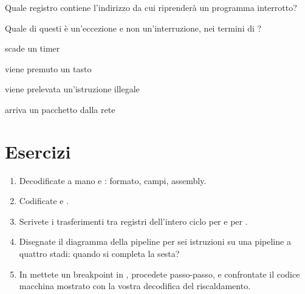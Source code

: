 \begin{quiz}{Quale registro contiene l'indirizzo da cui riprenderà un programma \riscv interrotto?}
\item {}
\item {}
\item {}
\item {}
\end{quiz}

\begin{quiz}{Quale di questi è un'eccezione e non un'interruzione, nei termini di \riscv?}
\item scade un timer
\item viene premuto un tasto
\item viene prelevata un'istruzione illegale
\item arriva un pacchetto dalla rete
\end{quiz}

\section{Esercizi}

\begin{exercise}
\begin{enumerate}[nosep]
\item Decodificate a mano  e : formato, campi,
  assembly.
\item Codificate  e .
\item Scrivete i trasferimenti tra registri dell'intero ciclo per
   e per .
\item Disegnate il diagramma della pipeline per sei istruzioni su una pipeline
  a quattro stadi: quando si completa la sesta?
\item In \prgqt mettete un breakpoint in , procedete
  passo-passo, e confrontate il codice macchina mostrato con la vostra
  decodifica del riscaldamento.
\end{enumerate}
\end{exercise}

